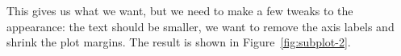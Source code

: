 % 


This gives us what we want, but we need to make a few tweaks to the appearance: the text should be smaller, we want to remove the axis labels and shrink the plot margins.  The result is shown in Figure~\ref{fig:subplot-2}.

% 
% 


\begin{figure}[htbp]
  \centering
  \caption{}
  \label{fig:subplot}
\end{figure}

